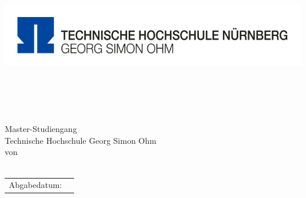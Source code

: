 \thispagestyle{plain}
\begin{titlepage}
\enlargethispage{3.5cm}
\sffamily 								%
\begin{minipage}{\textwidth}
	\vspace{-2cm}
	\noindent \includegraphics[scale=0.2]{Images/Logo_TH.png} \hfill
\end{minipage} 
\begin{center}

\huge{\textsc{\textbf{\titel}}}\\[1.5ex]
\Large{\textbf{\untertitel}}\\[5ex]
\LARGE{\textbf{\ausarbeitung}}\\[2ex]
\normalsize{~}\\[3ex]
\Large{Master-Studiengang \textit{\studiengang}}\\[1ex]
\normalsize{Technische Hochschule Georg Simon Ohm}\\[5ex]
von\\[1ex] \autor \\[12ex]

\begin{tabular}{ll}
	Abgabedatum:					& \quad \abgabeGI \\ 
	
	
	
\end{tabular} 

\end{center}

\end{titlepage}
\onehalfspacing